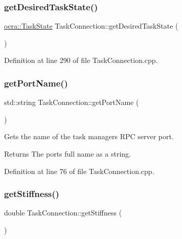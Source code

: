 \subsubsection{\texorpdfstring{get\+Desired\+Task\+State()}{getDesiredTaskState()}}
{\footnotesize\ttfamily \hyperlink{classocra_1_1TaskState}{ocra\+::\+Task\+State} Task\+Connection\+::get\+Desired\+Task\+State (\begin{DoxyParamCaption}{ }\end{DoxyParamCaption})}



Definition at line 290 of file Task\+Connection.\+cpp.

\hypertarget{classocra__recipes_1_1TaskConnection_a9898d85644f690d4b0e5d5a2c8338d63}{}\label{classocra__recipes_1_1TaskConnection_a9898d85644f690d4b0e5d5a2c8338d63} 
\subsubsection{\texorpdfstring{get\+Port\+Name()}{getPortName()}}
{\footnotesize\ttfamily std\+::string Task\+Connection\+::get\+Port\+Name (\begin{DoxyParamCaption}{ }\end{DoxyParamCaption})}

Gets the name of the task manager\textquotesingle{}s R\+PC server port.

\begin{DoxyReturn}{Returns}
The port\textquotesingle{}s full name as a string. 
\end{DoxyReturn}


Definition at line 76 of file Task\+Connection.\+cpp.

\hypertarget{classocra__recipes_1_1TaskConnection_a88bda0e9df65e379e1b7f5b89929fdde}{}\label{classocra__recipes_1_1TaskConnection_a88bda0e9df65e379e1b7f5b89929fdde} 
\subsubsection{\texorpdfstring{get\+Stiffness()}{getStiffness()}}
{\footnotesize\ttfamily double Task\+Connection\+::get\+Stiffness (\begin{DoxyParamCaption}{ }\end{DoxyParamCaption})}

